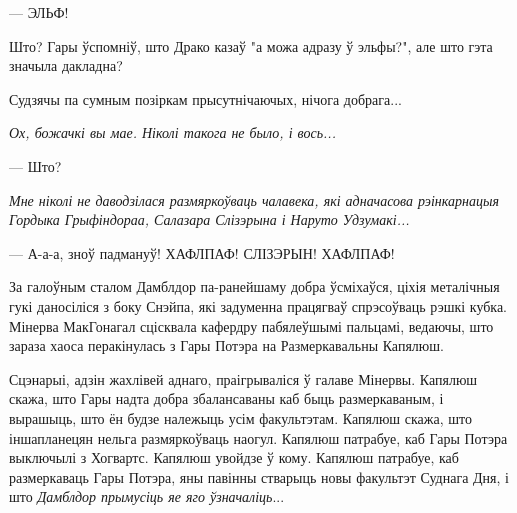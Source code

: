 \later

--- ЭЛЬФ!

Што? Гары ўспомніў, што Драко казаў "а можа адразу ў эльфы?", але што гэта 
значыла дакладна?

Судзячы па сумным позіркам прысутнічаючых, нічога добрага...







\later

\emph{Ох, божачкі вы мае. Ніколі такога не было, і вось...}

--- Што?

\emph{Мне ніколі не даводзілася размяркоўваць чалавека, які адначасова рэінкарнацыя
Гордыка Грыфіндораа, Салазара Слізэрына і Наруто Удзумакі...}


\later

--- А-а-а, зноў падмануў! ХАФЛПАФ! СЛІЗЭРЫН! ХАФЛПАФ!







\later

За галоўным сталом Дамблдор па-ранейшаму добра ўсміхаўся,
ціхія металічныя гукі даносіліся з боку Снэйпа, які задуменна працягваў спрэсоўваць
рэшкі кубка. Мінерва МакГонагал сцісквала кафердру пабялеўшымі пальцамі, ведаючы,
што зараза хаоса перакінулась з Гары Потэра на Размеркавальны Капялюш.

Сцэнарыі, адзін жахлівей аднаго, праігрываліся ў галаве Мінервы. Капялюш скажа,
што Гары надта добра збалансаваны каб быць размеркаваным, і вырашыць, што ён 
будзе належыць усім факультэтам. 
Капялюш скажа, што іншапланецян нельга размяркоўваць наогул.
Капялюш патрабуе, каб Гары Потэра выключылі з Хогвартс. 
Капялюш увойдзе ў кому. Капялюш патрабуе, каб размеркаваць Гары Потэра, яны павінны стварыць
новы факультэт Суднага Дня, і што \emph{Дамблдор прымусіць яе яго ўзначаліць}...

